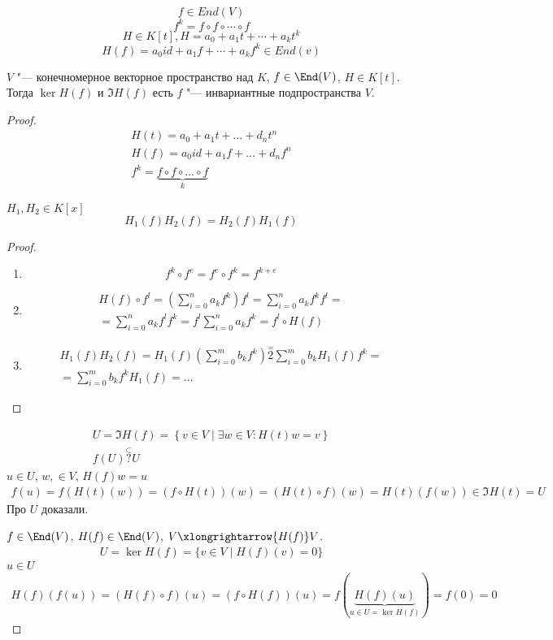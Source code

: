 $$f \in End(V)$$
$$f^{k} = f\circ f \circ \cdots \circ f$$
$$H \in K[t], H = a_0 + a_1t + \cdots + a_kt^{k}$$
$$H(f) = a_0 id + a_1f + \cdots + a_kf^k \in End(v)$$


\begin{theorem}
	$V$ "--- конечномерное векторное пространство над $K$, $f \in \End(V)$, $H \in K[t]$.
	Тогда $\ker H(f)$ и $\Im H(f)$ есть $f$ "--- инвариантные подпространства $V$.
\end{theorem}

\begin{proof}
	\begin{gather*}
		H(t) = a_0 + a_1 t + \dots + d_n t^n \\
		H(f) = a_0 id + a_1 f + \dots + d_n f^n \\
		f^k = \underbrace{f \circ f \circ \dots \circ f}_{k}
	\end{gather*}
	\begin{lemma}
		$H_1, H_2 \in K[x]$
		\[ H_1(f)H_2(f) = H_2(f)H_1(f) \]
	\end{lemma}
	\begin{proof}
		\begin{enumerate}
		\item
			\[ f^k \circ f^e = f^e \circ f^k = f^{k+e} \]

		\item
			\begin{gather*}
				H(f) \circ f^l = \left( \sum_{i=0}^n a_k f^k \right) f^l = \sum_{i=0}^n a_k f^k f^l = \\
				= \sum_{i=0}^n a_k f^l f^k = f^l \sum_{i=0}^n a_k f^k = f^l \circ H(f)
			\end{gather*}

		\item
			\begin{gather*}
				H_1(f) H_2(f) = H_1(f) \left( \sum_{i=0}^m b_k f^k \right) \stackrel{=}{2} \sum_{i=0}^m b_k H_1(f) f^k = \\
				= \sum_{i=0}^m b_k f^k H_1(f) = ...
			\end{gather*}
		\end{enumerate}
	\end{proof}
	\begin{gather*}
		U = \Im H(f) = \left\{ v \in V \mid \exists w \in V\colon H(t)w = v\right\} \\
		f(U) \stackrel{\subset}{?} U
	\end{gather*}
	$u \in U$, $w, \in V$, $H(f)w = u$
	\begin{gather*}
		f(u) = f(H(t)(w)) = (f \circ H(t))(w) = (H(t) \circ f)(w) = H(t) (f(w)) \in \Im H(t) = U
	\end{gather*}
	Про $U$ доказали.

	$f \in \End (V)$, $H(f) \in \End(V)$, $V \xlongrightarrow{H(f)} V$.
	\begin{gather*}
		U = \ker H(f) = \{v \in V \mid H(f)(v) = 0\} 
	\end{gather*}
	$u \in U$
	\begin{gather*}
		H(f)(f(u)) = (H(f) \circ f)(u) = (f \circ H(f))(u) = f (\underbrace{H(f)(u)}_{u \in U = \ker H(f)}) = f(0) = 0
	\end{gather*}
\end{proof}

